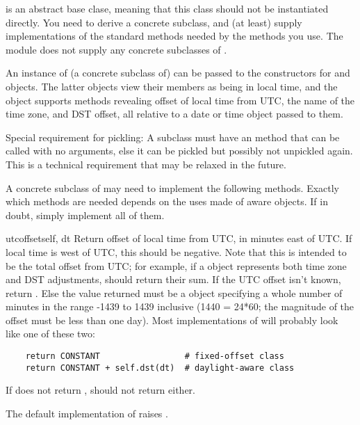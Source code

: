  is an abstract base clase, meaning that this class
should not be instantiated directly.  You need to derive a concrete
subclass, and (at least) supply implementations of the standard
 methods needed by the  methods you
use.  The  module does not supply any concrete
subclasses of .

An instance of (a concrete subclass of)  can be passed
to the constructors for  and  objects.
The latter objects view their members as being in local time, and the
 object supports methods revealing offset of local time
from UTC, the name of the time zone, and DST offset, all relative to a
date or time object passed to them.

Special requirement for pickling:  A  subclass must have an
 method that can be called with no arguments, else it
can be pickled but possibly not unpickled again.  This is a technical
requirement that may be relaxed in the future.

A concrete subclass of  may need to implement the
following methods.  Exactly which methods are needed depends on the
uses made of aware  objects.  If in doubt, simply
implement all of them.

\begin{methoddesc}{utcoffset}{self, dt}
  Return offset of local time from UTC, in minutes east of UTC.  If
  local time is west of UTC, this should be negative.  Note that this
  is intended to be the total offset from UTC; for example, if a
   object represents both time zone and DST adjustments,
   should return their sum.  If the UTC offset
  isn't known, return .  Else the value returned must be
  a  object specifying a whole number of minutes in the
  range -1439 to 1439 inclusive (1440 = 24*60; the magnitude of the offset
  must be less than one day).  Most implementations of
   will probably look like one of these two:

\begin{verbatim}
    return CONSTANT                 # fixed-offset class
    return CONSTANT + self.dst(dt)  # daylight-aware class
\end{verbatim}

    If  does not return ,
     should not return  either.

    The default implementation of  raises
    .
\end{methoddesc}

